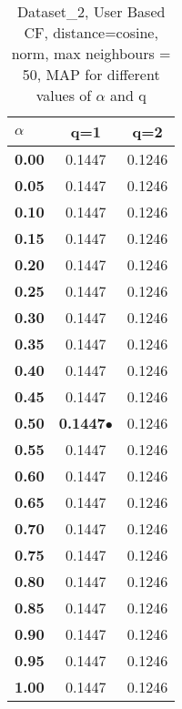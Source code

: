 \begin{table}
\begin{center}
\begin{tabular}{ | l || c | c |}
\hline
\textbf{$\alpha$} & \textbf{q=1} & \textbf{q=2} \\
\hline
\textbf{0.00} & 0.1447 & 0.1246\\
\hline
\textbf{0.05} & 0.1447 & 0.1246\\
\hline
\textbf{0.10} & 0.1447 & 0.1246\\
\hline
\textbf{0.15} & 0.1447 & 0.1246\\
\hline
\textbf{0.20} & 0.1447 & 0.1246\\
\hline
\textbf{0.25} & 0.1447 & 0.1246\\
\hline
\textbf{0.30} & 0.1447 & 0.1246\\
\hline
\textbf{0.35} & 0.1447 & 0.1246\\
\hline
\textbf{0.40} & 0.1447 & 0.1246\\
\hline
\textbf{0.45} & 0.1447 & 0.1246\\
\hline
\textbf{0.50} & \textbf{0.1447}$\bullet$ & 0.1246\\
\hline
\textbf{0.55} & 0.1447 & 0.1246\\
\hline
\textbf{0.60} & 0.1447 & 0.1246\\
\hline
\textbf{0.65} & 0.1447 & 0.1246\\
\hline
\textbf{0.70} & 0.1447 & 0.1246\\
\hline
\textbf{0.75} & 0.1447 & 0.1246\\
\hline
\textbf{0.80} & 0.1447 & 0.1246\\
\hline
\textbf{0.85} & 0.1447 & 0.1246\\
\hline
\textbf{0.90} & 0.1447 & 0.1246\\
\hline
\textbf{0.95} & 0.1447 & 0.1246\\
\hline
\textbf{1.00} & 0.1447 & 0.1246\\
\hline
\end{tabular}
\caption{Dataset\_2, User Based CF, distance=cosine, norm, max neighbours = 50, MAP for different values of $\alpha$ and q}
\label{table:MAP_Dataset_2_ucf_cosine_norm_mnn=50}
\end{center}
\end{table}
